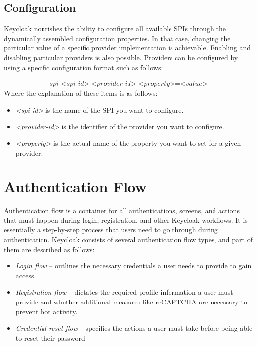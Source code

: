 \newpage

\subsection{Configuration}
Keycloak nourishes the ability to configure all available SPIs through the dynamically assembled configuration properties.
In that case, changing the particular value of a specific provider implementation is achievable.
Enabling and disabling particular providers is also possible.\cite{keycloak-spi-config}
\newline
\newline
Providers can be configured by using a specific configuration format such as follows:

\begin{align}
    \textit{spi-<spi-id>-<provider-id>-<property>=<value>}
\end{align}
\newline
\newline
Where the explanation of these items is as follows:
\begin{itemize}
    \item \textit{<spi-id>} is the name of the SPI you want to configure.
    \item \textit{<provider-id>} is the identifier of the provider you want to configure.
    \item \textit{<property>} is the actual name of the property you want to set for a given provider.
\end{itemize}

\section{Authentication Flow} \label{keycloak-authentication-flows}
Authentication flow is a container for all authentications, screens, and actions that must happen during login, registration, and other Keycloak workflows.
It is essentially a step-by-step process that users need to go through during authentication.
\newline
\newline
Keycloak consists of several authentication flow types, and part of them are described as follows:

\begin{itemize}
    \item \textit{Login flow} -- outlines the necessary credentials a user needs to provide to gain access.
    \item \textit{Registration flow} -- dictates the required profile information a user must provide and whether additional measures like reCAPTCHA are necessary to prevent bot activity.
    \item \textit{Credential reset flow} -- specifies the actions a user must take before being able to reset their password.
\end{itemize}

